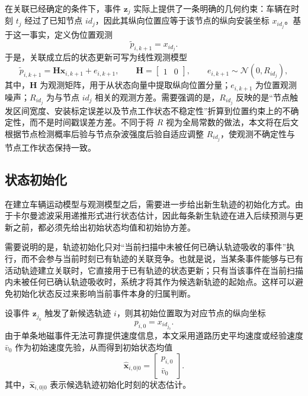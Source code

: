 \documentclass{xdupgthesis}
\begin{document}
在关联已经确定的条件下，事件 $\mathbf z_j$ 实际上提供了一条明确的几何约束：车辆在时刻 $t_j$ 经过了已知节点 $id_j$，因此其纵向位置应等于该节点的纵向安装坐标 $x_{id_j}$。基于这一事实，定义伪位置观测
\begin{equation}
	\tilde p_{i,k+1}=x_{id_j}.
	\label{eq:ch3_pseudo_meas}
\end{equation}
于是，关联成立后的状态更新可写为线性观测模型
\begin{equation}
	\tilde p_{i,k+1}
	=
	\mathbf H\mathbf x_{i,k+1}
	+
	e_{i,k+1},
	\qquad
	\mathbf H=
	\begin{bmatrix}
		1 & 0
	\end{bmatrix},
	\qquad
	e_{i,k+1}\sim\mathcal N(0,R_{id_j}),
	\label{eq:ch3_measurement_k}
\end{equation}
其中，$\mathbf H$ 为观测矩阵，用于从状态向量中提取纵向位置分量；$e_{i,k+1}$ 为位置观测噪声；$R_{id_j}$ 为与节点 $id_j$ 相关的观测方差。需要强调的是，$R_{id_j}$ 反映的是“节点触发区间宽度、安装标定误差以及节点工作状态不稳定性”折算到位置约束上的不确定性，而不是时间戳误差方差。不同于将 $R$ 视为全局常数的做法，本文将在后文根据节点检测概率后验与节点杂波强度后验自适应调整 $R_{id_j}$，使观测不确定性与节点工作状态保持一致。

\subsection{状态初始化}

在建立车辆运动模型与观测模型之后，需要进一步给出新生轨迹的初始化方式。由于卡尔曼滤波采用递推形式进行状态估计，因此每条新生轨迹在进入后续预测与更新之前，都必须先给出初始状态均值和初始协方差。

需要说明的是，轨迹初始化只对“当前扫描中未被任何已确认轨迹吸收的事件”执行，而不会参与当前时刻已有轨迹的关联竞争。也就是说，当某条事件能够与已有活动轨迹建立关联时，它直接用于已有轨迹的状态更新；只有当该事件在当前扫描内未被任何已确认轨迹吸收时，系统才将其作为候选新轨迹的起始点。这样可以避免初始化状态反过来影响当前事件本身的归属判断。

设事件 $\mathbf z_{j_0}$ 触发了新候选轨迹 $i$，则其初始位置取为对应节点的纵向坐标
\begin{equation}
	p_{i,0}=x_{id_{j_0}}.
	\label{eq:ch3_init_pos}
\end{equation}
由于单条地磁事件无法可靠提供速度信息，本文采用道路历史平均速度或经验速度 $\bar v_0$ 作为初始速度先验，从而得到初始状态均值
\begin{equation}
	\hat{\mathbf x}_{i,0|0}=
	\begin{bmatrix}
		p_{i,0}\\
		\bar v_0
	\end{bmatrix}.
	\label{eq:ch3_init_state}
\end{equation}
其中，$\hat{\mathbf x}_{i,0|0}$ 表示候选轨迹初始化时刻的状态估计。
\end{document}
